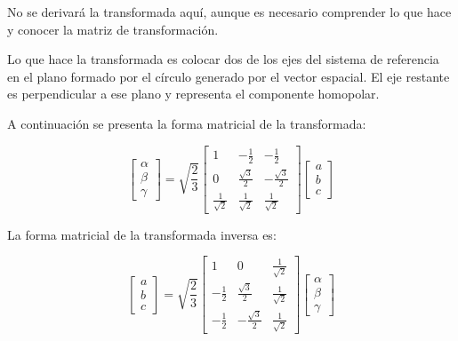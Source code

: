 No se derivará la transformada aquí, aunque es necesario comprender lo que hace y conocer la matriz de transformación.

Lo que hace la transformada es colocar dos de los ejes del sistema de referencia en el plano formado por el círculo generado por el vector espacial. El eje restante es perpendicular a ese plano y representa el componente homopolar.

A continuación se presenta la forma matricial de la transformada:

\begin{equation}
    \begin{bmatrix}
        \alpha \\
        \beta \\
        \gamma
    \end{bmatrix}
    =
    \sqrt{\frac{2}{3}}
    \begin{bmatrix}
        1 & -\frac{1}{2} & -\frac{1}{2} \\
        0 & \frac{\sqrt{3}}{2} & -\frac{\sqrt{3}}{2} \\
        \frac{1}{\sqrt{2}} & \frac{1}{\sqrt{2}} & \frac{1}{\sqrt{2}}
    \end{bmatrix}
    \begin{bmatrix}
        a \\
        b \\
        c
    \end{bmatrix}
\end{equation}

La forma matricial de la transformada inversa es:

\begin{equation}
    \begin{bmatrix}
        a \\
        b \\
        c
    \end{bmatrix}
    =
    \sqrt{\frac{2}{3}}
    \begin{bmatrix}
        1 & 0 & \frac{1}{\sqrt{2}} \\
        -\frac{1}{2} & \frac{\sqrt{3}}{2} & \frac{1}{\sqrt{2}} \\
        -\frac{1}{2} & -\frac{\sqrt{3}}{2} & \frac{1}{\sqrt{2}}
    \end{bmatrix}
    \begin{bmatrix}
        \alpha \\
        \beta \\
        \gamma
    \end{bmatrix}
\end{equation}

